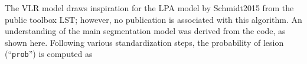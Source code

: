 \documentclass{article}
\newlength{\sliceheight}\setlength{\sliceheight}{3.5cm}
\newenvironment{subfigureside}[1][\sliceheight]{\begin{subfigure}{\textwidth}\centering\parbox[b][#1-1em][c]{0.5cm}{\subcaption{}} }{\end{subfigure}}
\begin{document}
  \begin{doublespace}
The VLR model draws inspiration for the LPA model by Schmidt2015 from the public toolbox LST; however, no publication is associated with this algorithm. An understanding of the main segmentation model was derived from the code, as shown here. Following various standardization steps, the probability of lesion (``\texttt{prob}'') is computed as

\end{doublespace}
\end{document}
